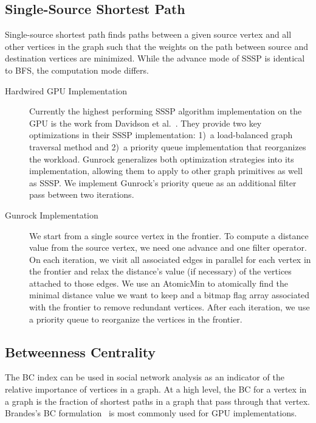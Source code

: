 \documentclass[format=acmsmall,review=false,screen=true]{acmart}
\begin{document}
\subsection{Single-Source Shortest Path}
\label{sec:sssp}
Single-source shortest path finds paths between a given source vertex
and all other vertices in the graph such that the weights on the path
between source and destination vertices are minimized. While the
advance mode of SSSP is identical to BFS, the computation mode
differs.

\begin{description}
\item[Hardwired GPU Implementation] Currently the highest performing
  SSSP algorithm implementation on the GPU is the work from Davidson
  et al.~. They provide two key
  optimizations in their SSSP implementation: 1)~a load-balanced graph
  traversal method and 2)~a priority queue implementation that
  reorganizes the workload. Gunrock generalizes both optimization
  strategies into its implementation, allowing them to apply to other
  graph primitives as well as SSSP\@. We implement Gunrock's priority
  queue as an additional filter pass between two iterations.

\item[Gunrock Implementation] We start from a single source vertex in
  the frontier. To compute a distance value from the source vertex, we
  need one advance and one filter operator. On each iteration, we
  visit all associated edges in parallel for each vertex in the
  frontier and relax the distance's value (if necessary) of the
  vertices attached to those edges. We use an AtomicMin to atomically
  find the minimal distance value we want to keep and a bitmap flag
  array associated with the frontier to remove redundant vertices.
  After each iteration, we use a priority queue to reorganize the
  vertices in the frontier.
\end{description}

\subsection{Betweenness Centrality}
\label{sec:app:bc}

The BC index can be used in social network analysis as an indicator of
the relative importance of vertices in a graph. At a high level, the
BC for a vertex in a graph is the fraction of shortest paths in a
graph that pass through that vertex. Brandes's BC
formulation~ is most commonly used for GPU
implementations.
\end{document}

